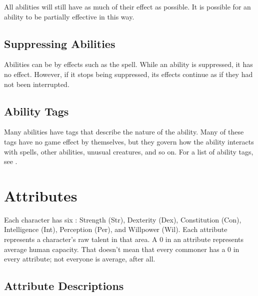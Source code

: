         All abilities will still have as much of their effect as possible.
        It is possible for an ability to be partially effective in this way.

    \subsection{Suppressing Abilities}\label{Suppressing Abilities}
        Abilities can be  by effects such as the  spell.
        While an ability is suppressed, it has no effect.
        However, if it stops being suppressed, its effects continue as if they had not been interrupted.

    \subsection{Ability Tags}
        Many abilities have tags that describe the nature of the ability.
        Many of these tags have no game effect by themselves, but they govern how the ability interacts with spells, other abilities, unusual creatures, and so on.
        For a list of ability tags, see .


\section{Attributes}\label{Attributes}

    Each character has six : Strength (Str), Dexterity (Dex), Constitution (Con), Intelligence (Int), Perception (Per), and Willpower (Wil).
    Each attribute represents a character's raw talent in that area.
    A 0 in an attribute represents average human capacity.
    That doesn't mean that every commoner has a 0 in every attribute; not everyone is average, after all.

    \subsection{Attribute Descriptions}

